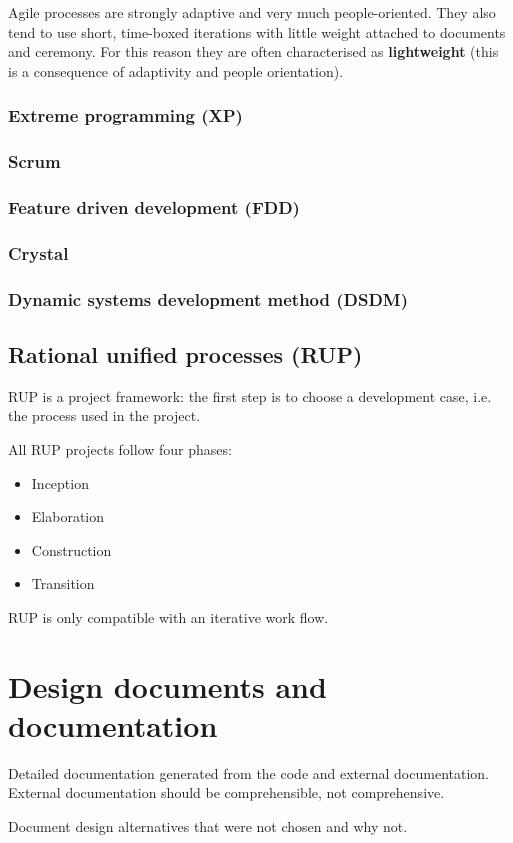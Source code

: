 Agile processes are strongly adaptive and very much people-oriented. They also tend to use short, time-boxed iterations with little weight attached to documents and ceremony. For this reason they are often characterised as \textbf{lightweight} (this is a consequence of adaptivity and people orientation).
\subsubsection{Extreme programming (XP)}
\subsubsection{Scrum}
\subsubsection{Feature driven development (FDD)}
\subsubsection{Crystal}
\subsubsection{Dynamic systems development method (DSDM)}

\subsection{Rational unified processes (RUP)}
RUP is a project framework: the first step is to choose a development case, i.e. the process used in the project.

All RUP projects follow four phases:
\begin{itemize}
\item Inception
\item Elaboration
\item Construction
\item Transition
\end{itemize}
RUP is only compatible with an iterative work flow.

\section{Design documents and documentation}
Detailed documentation generated from the code and external documentation. External documentation should be comprehensible, not comprehensive.

Document design alternatives that were not chosen and why not.

